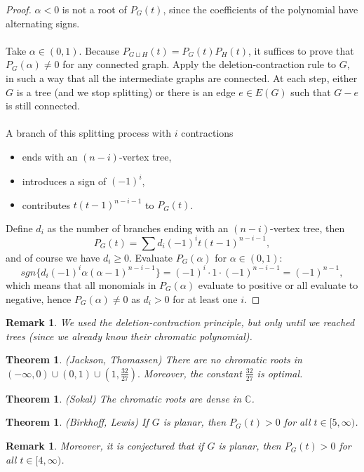 \documentclass[a4paper]{article}
\theoremstyle{plain}
\newtheorem{theorem}[lemma]{Theorem}
\theoremstyle{myremark}
\newtheorem{remark}[lemma]{Remark}
\begin{document}
\begin{proof}
$\alpha <0$ is not a root of $P_G(t)$, since the coefficients of the polynomial have alternating signs.
\\
\\ Take $\alpha \in (0,1)$. Because $P_{G\sqcup H}(t)=P_G(t)P_H(t)$, it suffices to prove that $P_G(\alpha)\neq 0$ for any connected graph. Apply the deletion-contraction rule to $G$, in such a way that all the intermediate graphs are connected. At each step, either $G$ is a tree (and we stop splitting) or there is an edge $e\in E(G)$ such that $G-e$ is still connected.
\\
\\ A branch of this splitting process with $i$ contractions
\begin{itemize}
\item ends with an $(n-i)$-vertex tree,
\item introduces a sign of $(-1)^i$,
\item contributes $t(t-1)^{n-i-1}$ to $P_G(t)$.
\end{itemize}
Define $d_i$ as the number of branches ending with an $(n-i)$-vertex tree, then
$$P_G(t)=\sum d_i(-1)^it(t-1)^{n-i-1},$$
and of course we have $d_i\geqslant 0$.
Evaluate $P_G(\alpha)$ for $\alpha \in (0,1)$:
$$sgn\{d_i(-1)^i\alpha (\alpha-1)^{n-i-1} \}=(-1)^i\cdot 1\cdot (-1)^{n-i-1}=(-1)^{n-1},$$
which means that all monomials in $P_G(\alpha)$  evaluate to positive or all evaluate to negative, hence $P_G(\alpha) \neq 0$ as $d_i>0$ for at least one $i$. 
\end{proof}

\begin{remark} We used the deletion-contraction principle, but only until we reached trees (since we already know their chromatic polynomial).
\end{remark}


\begin{theorem} \emph{(Jackson, Thomassen)}
There are no chromatic roots in $(- \infty, 0)\cup (0,1)\cup (1,\frac{32}{27}).$ Moreover, the constant $\frac{32}{27}$ is optimal. 
\end{theorem}

\begin{theorem} \emph{(Sokal)}
The chromatic roots are dense in $\mathbb{C}$.
\end{theorem}

\begin{theorem} \emph{(Birkhoff, Lewis)}
If $G$ is planar, then $P_G(t)>0$ for all $t\in [5,\infty)$.
\end{theorem}

\begin{remark} Moreover, it is conjectured that if $G$ is planar, then $P_G(t)>0$ for all $t\in [4,\infty)$.
\end{remark}
\end{document}
